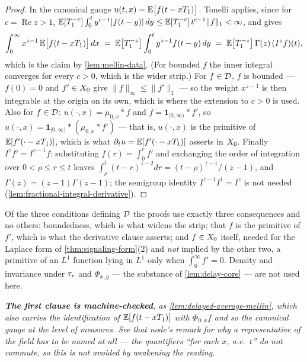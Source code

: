 \begin{proof}
\leanok
In the canonical gauge $u(t, x) = \mathbb{E}\bigl[f(t - x T_1)\bigr]$. Tonelli applies, since for
$c = \operatorname{Re} z > 1$,
$\mathbb{E}[T_1^{-c}]\int_0^t y^{c-1}|f(t-y)|\,dy \le \mathbb{E}[T_1^{-c}]\, t^{c-1}\|f\|_1 < \infty$, and
gives
\[
  \int_0^\infty x^{z-1}\,\mathbb{E}\bigl[f(t - xT_1)\bigr]\,dx
  \;=\; \mathbb{E}\bigl[T_1^{-z}\bigr]\int_0^t y^{z-1} f(t - y)\,dy
  \;=\; \mathbb{E}\bigl[T_1^{-z}\bigr]\,\Gamma(z)\,(I^z f)(t),
\]
which is the claim by \ref{lem:mellin-data}. (For bounded $f$ the inner integral converges for
every $c > 0$, which is the wider strip.) For $f \in \mathcal{D}$, $f$ is bounded --- $f(0) = 0$ and
$f' \in X_0$ give $\|f\|_\infty \le \|f'\|_1$ --- so the weight $x^{z-1}$ is then integrable at
the origin on its own, which is where the extension to $c > 0$ is used. Also for $f \in \mathcal{D}$:
$u(\cdot,x) = \mu_{0,x} * f$ and
$f = \mathbf{1}_{[0,\infty)} * f'$, so $u(\cdot,x) = \mathbf{1}_{[0,\infty)} * (\mu_{0,x} * f')$ ---
that is, $u(\cdot,x)$ is the primitive of $\mathbb{E}[f'(\cdot - xT_1)]$, which is what
$\partial_t u = \mathbb{E}[f'(\cdot - xT_1)]$ asserts in $X_0$. Finally $I^zf' = I^{z-1}f$: substituting
$f(r) = \int_0^r f'$ and exchanging the order of integration over $0 < \rho \le r \le t$ leaves
$\int_\rho^t (t-r)^{z-2}dr = (t-\rho)^{z-1}/(z-1)$, and $\Gamma(z) = (z-1)\Gamma(z-1)$; the
semigroup identity $I^{z-1}I^1 = I^z$ is not needed (\ref{lem:fractional-integral-derivative}).
\end{proof}

\begin{remark}\label{rem:core-accounting}
Of the three conditions defining $\mathcal{D}$ the proofs use exactly three consequences and no
others: boundedness, which is what widens the strip; that $f$ is the primitive of $f'$, which is
what the derivative clause asserts; and $f \in X_0$ itself, needed for the Laplace form of
\ref{thm:signaling-form}(2) and \emph{not} implied by the other two, a primitive of an $L^1$
function lying in $L^1$ only when $\int_0^\infty f' = 0$. Density and invariance under $\tau_r$
and $\Phi_{x,y}$ --- the substance of \ref{lem:delay-core} --- are not used here.
\end{remark}

\emph{\textbf{The first clause is machine-checked}, as \ref{lem:delayed-average-mellin}, which
also carries the identification of $\mathbb{E}[f(t-xT_1)]$ with $\Phi_{0,x}f$ and so the canonical gauge
at the level of measures. See that node's remark for why a representative of the field has to be
named at all --- the quantifiers ``for each $x$, a.e.\ $t$'' do not commute, so this is not avoided
by weakening the reading.}

